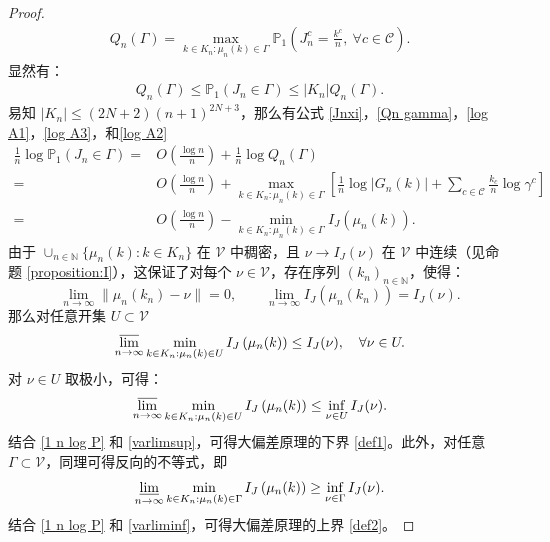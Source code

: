\begin{appendices}
\begin{proof}
\begin{align*}
Q_n(\Gamma) = \max_{k\in K_n: \mu_n(k) \in \Gamma}
\mathbb{P}_1\left(J^c_{n} = \frac{k^c}{n},\ \forall c\in\mathcal{C}\right).
\end{align*}
显然有：
\begin{align}\label{Qn gamma}
	Q_n(\Gamma)
	\le \mathbb{P}_1\left(J_{n} \in \Gamma\right)
	\le |K_n| Q_n(\Gamma).
\end{align}
易知 $|K_n| \le (2N+2)(n+1)^{2N+3}$，那么有公式 \eqref{Jnxi}，\eqref{Qn gamma}，\eqref{log A1}，\eqref{log A3}，和\eqref{log A2}
\begin{equation}\label{1 n log P}
	\begin{split}
	\frac{1}{n}\log\mathbb{P}_1\left(J_{n} \in \Gamma\right)=&O\left(\frac{\log n}{n}\right)+\frac{1}{n}\log Q_n(\Gamma)\\
	=&O\left(\frac{\log n}{n}\right)+\max_{k\in K_n: \mu_n(k) \in \Gamma}\left[\frac{1}{n}\log |G_{n}(k)|+\sum_{c \in \mathcal{C}}\frac{k_c}{n}\log \gamma^c\right]\\
	=&O\left(\frac{\log n}{n}\right)-\min_{k\in K_n: \mu_n(k) \in \Gamma}I_J\left(\mu_{n}(k)\right).
	\end{split}
\end{equation}
由于 $\cup_{n\in\mathbb{N}} \{\mu_{n}(k):k\in K_n\}$ 在 $\mathcal{V}$ 中稠密，且 $\nu\to I_J(\nu)$ 在 $\mathcal{V}$ 中连续（见命题 \ref{proposition:I}），这保证了对每个 $\nu\in \mathcal{V}$，存在序列 $(k_n)_{n\in \mathbb{N}}$，使得：
\begin{equation*}
\lim_{n\to\infty} \|\mu_{n}(k_n)-\nu\| = 0, \qquad \lim_{n\to\infty} I_J\left(\mu_{n}(k_n)\right) = I_J(\nu).
\end{equation*}
那么对任意开集 $U\subset \mathcal{V}$
\begin{equation*}
\varlimsup_{n\to\infty}\min_{k\in K_n: \mu_n(k) \in U}I_J\left(\mu_{n}(k)\right)\le I_J(\nu),\quad\forall\nu\in U.
\end{equation*}
对 $\nu\in U$ 取极小，可得：
\begin{equation}\label{varlimsup}
\varlimsup_{n\to\infty}\min_{k\in K_n: \mu_n(k) \in U}I_J\left(\mu_{n}(k)\right)\le \inf_{\nu\in U}I_J(\nu).
\end{equation}
结合 \eqref{1 n log P} 和 \eqref{varlimsup}，可得大偏差原理的下界 \eqref{def1}。此外，对任意$\Gamma \subset \mathcal{V}$，同理可得反向的不等式，即
\begin{equation}\label{varliminf}
\varliminf_{n\to\infty}\min_{k\in K_n: \mu_n(k) \in \Gamma}I_J\left(\mu_{n}(k)\right)\ge \inf_{\nu\in \Gamma}I_J(\nu).
\end{equation}
结合 \eqref{1 n log P} 和 \eqref{varliminf}，可得大偏差原理的上界 \eqref{def2}。
\end{proof}



\end{appendices}
